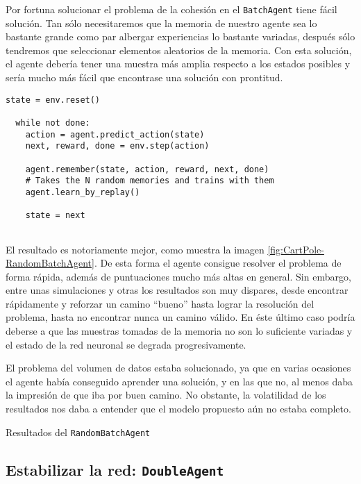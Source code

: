 Por fortuna solucionar el problema de la cohesión en el \texttt{BatchAgent} tiene fácil solución. Tan sólo necesitaremos que la memoria de nuestro agente sea lo bastante grande como par albergar experiencias lo bastante variadas, después sólo tendremos que seleccionar elementos aleatorios de la memoria. Con esta solución, el agente debería tener una muestra más amplia respecto a los estados posibles y sería mucho más fácil que encontrase una solución con prontitud.
  
\begin{minipage}{0.9\linewidth}%
\begin{lstlisting}[frame=tb, caption=Pseudocódigo RandomBatchAgent, inputencoding=latin1, label=code:cartpole_drl3]
  state = env.reset()

  while not done:
    action = agent.predict_action(state)
    next, reward, done = env.step(action)

    agent.remember(state, action, reward, next, done)
    # Takes the N random memories and trains with them
    agent.learn_by_replay()

    state = next
              
\end{lstlisting}%
\end{minipage}

El resultado es notoriamente mejor, como muestra la imagen \ref{fig:CartPole-RandomBatchAgent}. De esta forma el agente consigue resolver el problema de forma rápida, además de puntuaciones mucho más altas en general. Sin embargo, entre unas simulaciones y otras los resultados son muy dispares, desde encontrar rápidamente y reforzar un camino ``bueno'' hasta lograr la resolución del problema, hasta no encontrar nunca un camino válido. En éste último caso podría deberse a que las muestras tomadas de la memoria no son lo suficiente variadas y el estado de la red neuronal se degrada progresivamente.

El problema del volumen de datos estaba solucionado, ya que en varias ocasiones el agente había conseguido aprender una solución, y en las que no, al menos daba la impresión de que iba por buen camino. No obstante, la volatilidad de los resultados nos daba a entender que el modelo propuesto aún no estaba completo.

%
       {Resultados del \texttt{RandomBatchAgent}}


\subsection{Estabilizar la red: \texttt{DoubleAgent}}
\label{sec:DA}

